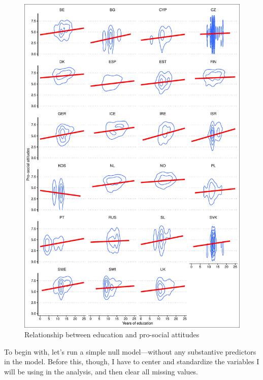 \documentclass[12pt,english]{article}\usepackage[]{graphicx}\usepackage[usenames, dvipsnames]{xcolor}
\begin{document}
\begin{figure}[!ht]
  \centering
  \includegraphics[scale=0.75]{../../05-graphs/Supplem-04}
  \caption{\label{fig:fig-02} Relationship between education and pro-social attitudes}
\end{figure}

To begin with, let's run a simple null model---without any substantive predictors in the model. Before this, though, I have to center and standardize the variables I will be using in the analysis, and then clear all missing values.
\end{document}
